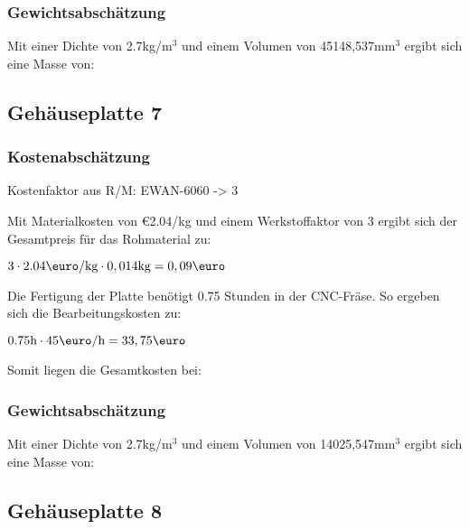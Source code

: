 \documentclass[10pt, a4paper]{article}
\begin{document}
\subsubsection{Gewichtsabschätzung}
Mit einer Dichte von 2.7kg/m$^3$ und einem Volumen von 45148,537mm$^3$ ergibt sich eine Masse von:
\begin{flushright}
\end{flushright}

\newpage
\subsection{Gehäuseplatte 7}
\begin{figure}[h]
  \centering
  \vspace{-10pt}
\end{figure}
\subsubsection{Kostenabschätzung}
\begin{center}
  Kostenfaktor aus R/M: EWAN-6060 -> 3
\end{center}
Mit Materialkosten von \euro2.04/kg und einem Werkstoffaktor von 3 ergibt sich der Gesamtpreis für das Rohmaterial zu: 
\begin{center}
    $3 \cdot 2.04\text{\euro/kg} \cdot 0,014\text{kg} = 0,09\text{\euro}$
\end{center}
Die Fertigung der Platte benötigt 0.75 Stunden in der CNC-Fräse. So ergeben sich die Bearbeitungskosten zu:
\begin{center}
  $0.75\text{h} \cdot 45\text{\euro/h}= 33,75\text{\euro}$
\end{center}
Somit liegen die Gesamtkosten bei:
\begin{flushright}
\end{flushright}
\subsubsection{Gewichtsabschätzung}
Mit einer Dichte von 2.7kg/m$^3$ und einem Volumen von 14025,547mm$^3$ ergibt sich eine Masse von:
\begin{flushright}
\end{flushright}

\newpage
\subsection{Gehäuseplatte 8}
\begin{figure}[h]
  \centering
  \vspace{-10pt}
\end{figure}
\end{document}
